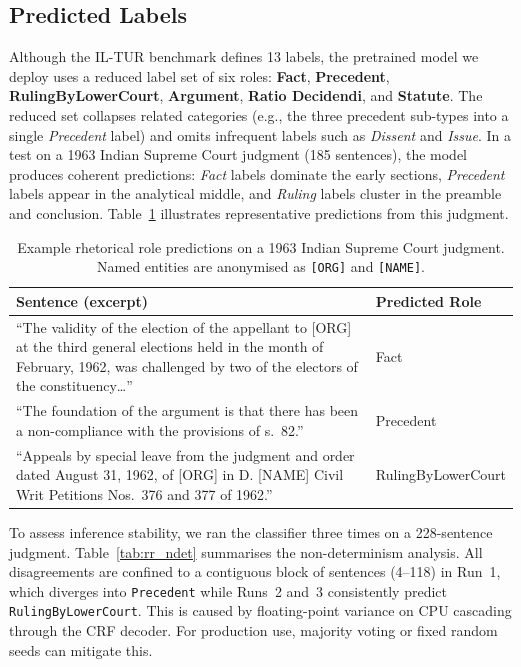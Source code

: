 \documentclass[11pt]{article}
\begin{document}
\subsection{Predicted Labels}

Although the IL-TUR benchmark defines 13 labels, the pretrained model we deploy uses a reduced label set of six roles: \textbf{Fact}, \textbf{Precedent}, \textbf{RulingByLowerCourt}, \textbf{Argument}, \textbf{Ratio Decidendi}, and \textbf{Statute}.
The reduced set collapses related categories (e.g., the three precedent sub-types into a single \emph{Precedent} label) and omits infrequent labels such as \emph{Dissent} and \emph{Issue}.
In a test on a 1963 Indian Supreme Court judgment (185 sentences), the model produces coherent predictions: \emph{Fact} labels dominate the early sections, \emph{Precedent} labels appear in the analytical middle, and \emph{Ruling} labels cluster in the preamble and conclusion.
Table~\ref{tab:rr_example} illustrates representative predictions from this judgment.

\begin{table}[htbp]
\centering
\footnotesize
\setlength{\tabcolsep}{4pt}
\begin{tabular}{@{}p{}l@{}}
\toprule
\textbf{Sentence (excerpt)} & \textbf{Predicted Role} \\
\midrule
``The validity of the election of the appellant to [ORG] at the third general elections held in the month of February, 1962, was challenged by two of the electors of the constituency\ldots'' & Fact \\
\midrule
``The foundation of the argument is that there has been a non-compliance with the provisions of s.~82.'' & Precedent \\
\midrule
``Appeals by special leave from the judgment and order dated August 31, 1962, of [ORG] in D. [NAME] Civil Writ Petitions Nos.~376 and 377 of 1962.'' & RulingByLowerCourt \\
\bottomrule
\end{tabular}
\caption{Example rhetorical role predictions on a 1963 Indian Supreme Court judgment. Named entities are anonymised as \texttt{[ORG]} and \texttt{[NAME]}.}
\label{tab:rr_example}
\end{table}

To assess inference stability, we ran the classifier three times on a 228-sentence judgment.
Table~\ref{tab:rr_ndet} summarises the non-determinism analysis.
All disagreements are confined to a contiguous block of sentences (4--118) in Run~1, which diverges into \texttt{Precedent} while Runs~2 and~3 consistently predict \texttt{RulingByLowerCourt}.
This is caused by floating-point variance on CPU cascading through the CRF decoder.
For production use, majority voting or fixed random seeds can mitigate this.
\end{document}

